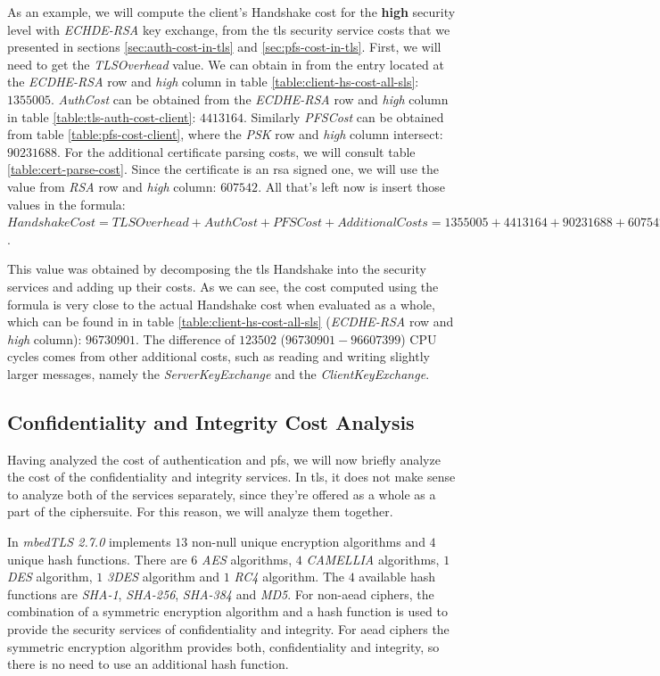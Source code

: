 As an example, we will compute the client's Handshake cost for the \textbf{high} security level with \textit{ECHDE-RSA}
key exchange, from the \gls{tls} security service costs that we presented in sections \ref{sec:auth-cost-in-tls} and \ref{sec:pfs-cost-in-tls}.
First, we will need to get the \textit{TLSOverhead} value. We can obtain in from the entry located at the
\textit{ECDHE-RSA} row and \textit{high} column in table \ref{table:client-hs-cost-all-sls}: $1355005$. \textit{AuthCost} can be obtained
from the \textit{ECDHE-RSA} row and \textit{high} column in table \ref{table:tls-auth-cost-client}: $4413164$. Similarly \textit{PFSCost}
can be obtained from table \ref{table:pfs-cost-client}, where the \textit{PSK} row and \textit{high} column intersect: $90231688$.
For the additional certificate parsing costs, we will consult table \ref{table:cert-parse-cost}. Since the certificate is an \gls{rsa} signed one,
we will use the value from \textit{RSA} row and \textit{high} column: $607542$. All that's left now is insert those values in the formula:
$Handshake Cost = TLS Overhead + Auth Cost + PFS Cost + Additional Costs = 1355005 + 4413164 + 90231688 + 607542 = 96607399$.

This value was obtained by decomposing the \gls{tls} Handshake into the security services and adding up their costs. As we can see,
the cost computed using the formula is very close to the actual Handshake cost when evaluated as a whole,
which can be found in in table \ref{table:client-hs-cost-all-sls} (\textit{ECDHE-RSA} row and \textit{high} column): $96730901$.
The difference of $123502$ ($96730901-96607399$) CPU cycles comes from other additional costs, such as reading and writing slightly larger
messages, namely the \textit{ServerKeyExchange} and the \textit{ClientKeyExchange}.

\subsection{Confidentiality and Integrity Cost Analysis} \label{sec:confid-costs}

Having analyzed the cost of authentication and \gls{pfs}, we will now briefly analyze the cost of the confidentiality and integrity services.
In \gls{tls}, it does not make sense to analyze both of the services separately, since they're offered as a whole as a part of the ciphersuite.
For this reason, we will analyze them together.

In \textit{mbedTLS 2.7.0} implements $13$ non-null unique encryption algorithms and $4$ unique hash functions. There are $6$ \textit{AES} 
algorithms, $4$ \textit{CAMELLIA} algorithms,
$1$ \textit{DES} algorithm, $1$ \textit{3DES} algorithm and $1$ \textit{RC4} algorithm. The $4$ available hash functions are \textit{SHA-1}, 
\textit{SHA-256}, \textit{SHA-384} and \textit{MD5}.
For non-\gls{aead} ciphers, the combination of a symmetric encryption algorithm and a hash function is used to provide the security services of confidentiality and 
integrity. For \gls{aead} ciphers the symmetric encryption algorithm provides both, confidentiality and integrity, so there is no need
to use an additional hash function.

